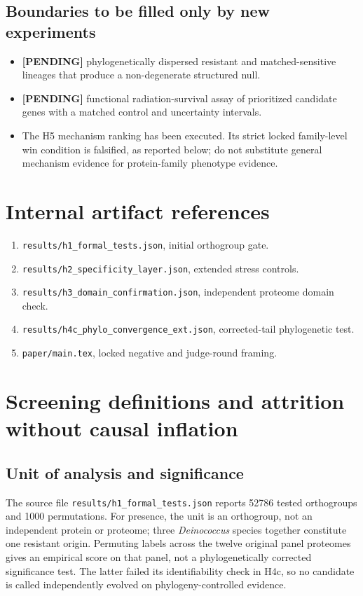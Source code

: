 \subsection{Boundaries to be filled only by new experiments}
\begin{itemize}\item \textbf{[PENDING]} phylogenetically dispersed resistant and matched-sensitive lineages that produce a non-degenerate structured null.
\item \textbf{[PENDING]} functional radiation-survival assay of prioritized candidate genes with a matched control and uncertainty intervals.
\item The H5 mechanism ranking has been executed. Its strict locked family-level win condition is falsified, as reported below; do not substitute general mechanism evidence for protein-family phenotype evidence.
\end{itemize}
\section{Internal artifact references}
\begin{enumerate}\item \texttt{results/h1\_formal\_tests.json}, initial orthogroup gate.\item \texttt{results/h2\_specificity\_layer.json}, extended stress controls.\item \texttt{results/h3\_domain\_confirmation.json}, independent proteome domain check.\item \texttt{results/h4c\_phylo\_convergence\_ext.json}, corrected-tail phylogenetic test.\item \texttt{paper/main.tex}, locked negative and judge-round framing.\end{enumerate}

\section{Screening definitions and attrition without causal inflation}
\subsection{Unit of analysis and significance}
The source file \texttt{results/h1\_formal\_tests.json} reports 52786 tested orthogroups and 1000 permutations. For presence, the unit is an orthogroup, not an independent protein or proteome; three \emph{Deinococcus} species together constitute one resistant origin. Permuting labels across the twelve original panel proteomes gives an empirical score on that panel, not a phylogenetically corrected significance test. The latter failed its identifiability check in H4c, so no candidate is called independently evolved on phylogeny-controlled evidence.

